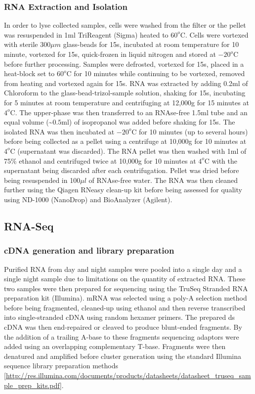 \documentclass[a4paper,11pt]{article}
\begin{document}
\subsubsection{RNA Extraction and Isolation}
In order to lyse collected samples, cells were washed from the filter or the pellet was resuspended in 1ml TriReagent (Sigma) heated to $60^{o}$C. Cells were vortexed with sterile 300$\mu m$ glass-beads for 15s, incubated at room temperature for 10 minute, vortexed for 15s, quick-frozen in liquid nitrogen and stored at $-20^{o}$C before further processing.  
Samples were defrosted, vortexed for 15s, placed in a heat-block set to $60^{o}$C for 10 minutes while continuing to be vortexed, removed from heating and vortexed again for 15s.  
RNA was extracted by adding 0.2ml of Chloroform to the glass-bead-trizol-sample solution, shaking for 15s, incubating for 5 minutes at room temperature and centrifuging at 12,000g for 15 minutes at $4^{o}$C.  
The upper-phase was then transferred to an RNAse-free 1.5ml tube and an equal volume (\textasciitilde$0.5$ml) of isopropanol was added before shaking for 15s.  
The isolated RNA was then incubated at $-20^{o}$C for 10 minutes (up to several hours) before being collected as a pellet using a centrifuge at 10,000g for 10 minutes at $4^{o}$C (supernatant was discarded). 
The RNA pellet was then washed with 1ml of 75\% ethanol and centrifuged twice at 10,000g for 10 minutes at $4^{o}$C with the supernatant being discarded after each centrifugation.  
Pellet was dried before being resuspended in 100$\mu l$ of RNAse-free water.  
The RNA was then cleaned further using the Qiagen RNeasy clean-up kit before being assessed for quality using ND-1000 (NanoDrop) and BioAnalyzer (Agilent).

\subsection{RNA-Seq}
\subsubsection{cDNA generation and library preparation}

Purified RNA from day and night samples were pooled into a single day and a single night sample due to limitations on the quantity of extracted RNA. 
These two samples were then prepared for sequencing using the TruSeq Stranded RNA preparation kit (Illumina).  
mRNA was selected using a poly-A selection method before being fragmented, cleaned-up using ethanol and then reverse transcribed into single-stranded cDNA using random hexamer primers. 
The prepared ds cDNA was then end-repaired or cleaved to produce blunt-ended fragments.  
By the addition of a trailing A-base to these fragments sequencing adaptors were added using an overlapping complementary T-base.  
Fragments were then denatured and amplified before cluster generation using the standard Illumina sequence library preparation methods [\url{http://res.illumina.com/documents/products/datasheets/datasheet_truseq_sample_prep_kits.pdf}].
\end{document}
